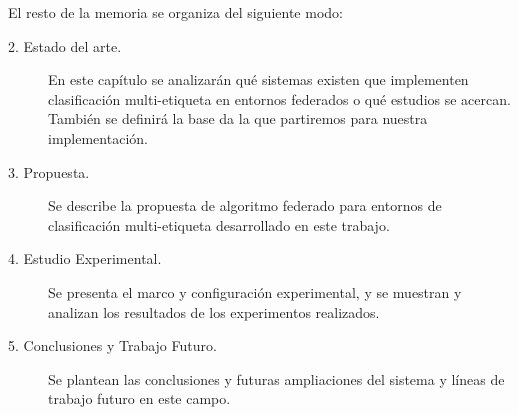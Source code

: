 El resto de la memoria se organiza del siguiente modo:

\begin{description}
\item[2. Estado del arte.] En este capítulo se analizarán qué sistemas existen que implementen clasificación multi-etiqueta en entornos federados o qué estudios se acercan. También se definirá la base da la que partiremos para nuestra implementación.
\item[3. Propuesta.] Se describe la propuesta de algoritmo federado para entornos de clasificación multi-etiqueta desarrollado en este trabajo. 
\item[4. Estudio Experimental.] Se presenta el marco y configuración experimental, y se muestran y analizan los resultados de los experimentos realizados.
\item[5. Conclusiones y Trabajo Futuro.] Se plantean las conclusiones y futuras ampliaciones del sistema y líneas de trabajo futuro en este campo.
\end{description}


\cleardoublepage
